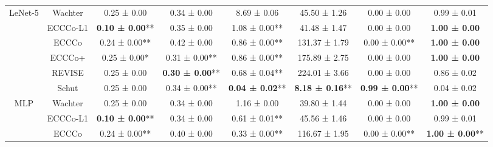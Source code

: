 \begin{table}
{\begin{tabular}[t]{cccccccc}
\multirow[t]{-6}{*}{\centering\arraybackslash LeNet-5} & Wachter & 0.25 ± 0.00\hphantom{*}\hphantom{*} & 0.34 ± 0.00\hphantom{*}\hphantom{*} & 8.69 ± 0.06\hphantom{*}\hphantom{*} & 45.50 ± 1.26\hphantom{*}\hphantom{*} & 0.00 ± 0.00\hphantom{*}\hphantom{*} & 0.99 ± 0.01\hphantom{*}\hphantom{*}\\
\cmidrule{1-8}
 & ECCCo-L1 & \textbf{0.10 ± 0.00}** & 0.35 ± 0.00\hphantom{*}\hphantom{*} & 1.08 ± 0.00** & 41.48 ± 1.47\hphantom{*}\hphantom{*} & 0.00 ± 0.00\hphantom{*}\hphantom{*} & \textbf{1.00 ± 0.00}\hphantom{*}\hphantom{*}\\

 & ECCCo & 0.24 ± 0.00** & 0.42 ± 0.00\hphantom{*}\hphantom{*} & 0.86 ± 0.00** & 131.37 ± 1.79\hphantom{*}\hphantom{*} & 0.00 ± 0.00** & \textbf{1.00 ± 0.00}\hphantom{*}\hphantom{*}\\

 & ECCCo+ & 0.25 ± 0.00*\hphantom{*} & 0.31 ± 0.00** & 0.86 ± 0.00** & 175.89 ± 2.75\hphantom{*}\hphantom{*} & 0.00 ± 0.00\hphantom{*}\hphantom{*} & \textbf{1.00 ± 0.00}\hphantom{*}\hphantom{*}\\

 & REVISE & 0.25 ± 0.00\hphantom{*}\hphantom{*} & \textbf{0.30 ± 0.00}** & 0.68 ± 0.04** & 224.01 ± 3.66\hphantom{*}\hphantom{*} & 0.00 ± 0.00\hphantom{*}\hphantom{*} & 0.86 ± 0.02\hphantom{*}\hphantom{*}\\

 & Schut & 0.25 ± 0.00\hphantom{*}\hphantom{*} & 0.34 ± 0.00** & \textbf{0.04 ± 0.02}** & \textbf{8.18 ± 0.16}** & \textbf{0.99 ± 0.00}** & 0.04 ± 0.02\hphantom{*}\hphantom{*}\\

\multirow[t]{-6}{*}{\centering\arraybackslash MLP} & Wachter & 0.25 ± 0.00\hphantom{*}\hphantom{*} & 0.34 ± 0.00\hphantom{*}\hphantom{*} & 1.16 ± 0.00\hphantom{*}\hphantom{*} & 39.80 ± 1.44\hphantom{*}\hphantom{*} & 0.00 ± 0.00\hphantom{*}\hphantom{*} & \textbf{1.00 ± 0.00}\hphantom{*}\hphantom{*}\\
\cmidrule{1-8}
 & ECCCo-L1 & \textbf{0.10 ± 0.00}** & 0.34 ± 0.00\hphantom{*}\hphantom{*} & 0.61 ± 0.01** & 45.56 ± 1.46\hphantom{*}\hphantom{*} & 0.00 ± 0.00\hphantom{*}\hphantom{*} & 0.99 ± 0.01\hphantom{*}\hphantom{*}\\

 & ECCCo & 0.24 ± 0.00** & 0.40 ± 0.00\hphantom{*}\hphantom{*} & 0.33 ± 0.00** & 116.67 ± 1.95\hphantom{*}\hphantom{*} & 0.00 ± 0.00** & \textbf{1.00 ± 0.00}**\\


\end{tabular}}
\end{table}
